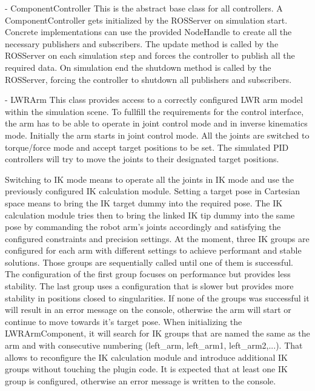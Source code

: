 - ComponentController
  This is the abstract base class for all controllers. A ComponentController gets initialized by
  the ROSServer on simulation start. Concrete implementations can use the provided NodeHandle to
  create all the necessary publishers and subscribers. The update method is called by the ROSServer
  on each simulation step and forces the controller to publish all the required data. On simulation
  end the shutdown method is called by the ROSServer, forcing the controller to shutdown all 
  publishers and subscribers.
  
- LWRArm
  This class provides access to a correctly configured LWR arm model within the simulation scene.
  To fullfill the requirements for the control interface, the arm has to be able to operate in joint
  control mode and in inverse kinematics mode. Initially the arm starts in joint control mode. All 
  the joints are switched to torque/force mode and accept target positions to be set. The simulated
  PID controllers will try to move the joints to their designated target positions. 
  
  Switching to IK mode means to operate all the joints in IK mode and use the previously configured   
  IK calculation module. Setting a target pose in Cartesian space means to bring the IK target dummy
  into the required pose. The IK calculation module tries then to bring the linked IK tip dummy into
  the same pose by commanding the robot arm's joints accordingly and satisfying the configured
  constraints and precision settings. At the moment, three IK groups are configured for
  each arm with different settings to achieve performant and stable solutions. Those groups are
  sequentially called until one of them is successful. The configuration of the first group focuses
  on performance but provides less stability. The last group uses a configuration that is slower but
  provides more stability in positions closed to singularities. If none of the groups was successful
  it will result in an error message on the console, otherwise the arm will start or continue to move
  towards it's target pose. When initializing the LWRArmComponent, it will search for IK groups that 
  are named the same as the arm and with consecutive numbering (left\_arm, left\_arm1,
  left\_arm2,...).
  That allows to reconfigure the IK calculation module and introduce additional IK groups without 
  touching the plugin code. It is expected that at least one IK group is configured, otherwise
  an error message is written to the console.
  
